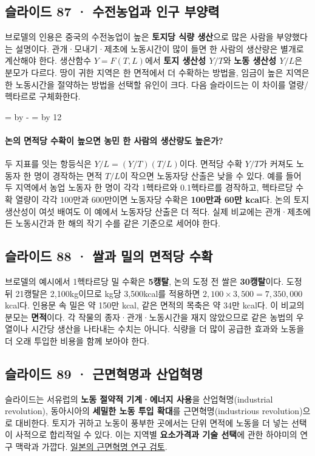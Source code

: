 \documentclass[10pt,a4paper]{article}
\newcommand{\ReserveQuestionSpace}{%
  \par\begingroup
  \dimen0=\pagegoal \advance\dimen0 by -\pagetotal
  \dimen2=\baselineskip \multiply\dimen2 by 12
  \ifdim\dimen0<\dimen2 \newpage\fi
  \endgroup}
\begin{document}
\subsection{슬라이드 87 · 수전농업과 인구 부양력}
브로델의 인용은 중국의 수전농업이 높은 \textbf{토지당 식량 생산}으로 많은 사람을 부양했다는 설명이다. 관개·모내기·제초에 노동시간이 많이 들면 한 사람의 생산량은 별개로 계산해야 한다. 생산함수 $Y=F(T,L)$에서 \textbf{토지 생산성 $Y/T$}와 \textbf{노동 생산성 $Y/L$}은 분모가 다르다. 땅이 귀한 지역은 한 면적에서 더 수확하는 방법을, 임금이 높은 지역은 한 노동시간을 절약하는 방법을 선택할 유인이 크다. 다음 슬라이드는 이 차이를 열량/헥타르로 구체화한다.\par

\ReserveQuestionSpace
\paragraph{논의 면적당 수확이 높으면 농민 한 사람의 생산량도 높은가?}
두 지표를 잇는 항등식은 $Y/L=(Y/T)(T/L)$이다. 면적당 수확 $Y/T$가 커져도 노동자 한 명이 경작하는 면적 $T/L$이 작으면 노동자당 산출은 낮을 수 있다. 예를 들어 두 지역에서 농업 노동자 한 명이 각각 1헥타르와 0.1헥타르를 경작하고, 헥타르당 수확 열량이 각각 100만과 600만이면 노동자당 수확은 \textbf{100만과 60만 kcal}다. 논의 토지 생산성이 여섯 배여도 이 예에서 노동자당 산출은 더 적다. 실제 비교에는 관개·제초에 든 노동시간과 한 해의 작기 수를 같은 기준으로 세어야 한다.\par

\subsection{슬라이드 88 · 쌀과 밀의 면적당 수확}
브로델의 예시에서 1헥타르당 밀 수확은 \textbf{5캥탈}, 논의 도정 전 쌀은 \textbf{30캥탈}이다. 도정 뒤 21캥탈은 2,100kg이므로 kg당 3,500kcal를 적용하면 $2{,}100\times3{,}500=7{,}350{,}000$kcal다. 인용문 속 밀은 약 150만 kcal, 같은 면적의 목축은 약 34만 kcal다. 이 비교의 분모는 \textbf{면적}이다. 각 작물의 종자·관개·노동시간을 재지 않았으므로 같은 농법의 우열이나 시간당 생산을 나타내는 수치는 아니다. 식량을 더 많이 공급한 효과와 노동을 더 오래 투입한 비용을 함께 보아야 한다.\par

\subsection{슬라이드 89 · 근면혁명과 산업혁명}
슬라이드는 서유럽의 \textbf{노동 절약적 기계·에너지 사용}을 산업혁명(industrial revolution), 동아시아의 \textbf{세밀한 노동 투입 확대}를 근면혁명(industrious revolution)으로 대비한다. 토지가 귀하고 노동이 풍부한 곳에서는 단위 면적에 노동을 더 넣는 선택이 사적으로 합리적일 수 있다. 이는 지역별 \textbf{요소가격과 기술 선택}에 관한 하야미의 연구 맥락과 가깝다. \href{https://onlinelibrary.wiley.com/doi/abs/10.1111/j.1467-8446.2010.00304.x}{일본의 근면혁명 연구 검토}.\par
\end{document}
